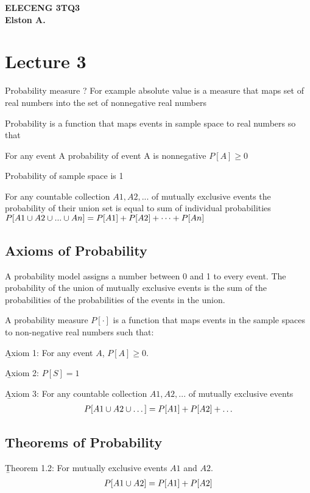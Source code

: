 \documentclass[12pt, titlepage, oneside]{article}
\begin{document}
	
	\textbf{ELECENG 3TQ3}\\
	\textbf{Elston A.}
	
	\section{Lecture 3}
	
	\items
 \item Probability measure ? For example absolute value is a measure that maps set of real numbers into the set of nonnegative real numbers
 \item Probability is a function that maps events in sample space to real numbers so that
 \item For any event A probability of event A is nonnegative $P[A] \geq 0$
 \item Probability of sample space is 1
\item For any countable collection $A1,A2,...$ of mutually exclusive events the probability of their union set is equal to sum of individual probabilities $P[A1 \cup A2 \cup ... \cup An] = P[A1] + P[A2] + \dots + P[An]$
\eitems


\subsection{Axioms of Probability}

A probability model assigns a number between 0 and 1 to every event. The probability of the union of mutually exclusive events is the sum of the probabilities of the probabilities of the events in the union.


A probability measure $P[\cdot]$ is a function that maps events in the sample spaces to non-negative real numbers such that:

\b{Axiom 1}: For any event $A$, $P[A] \geq 0$.

\b{Axiom 2}: $P[S] = 1$

\b{Axiom 3}: For any countable collection $A1,A2,...$ of mutually exclusive events
\begin{align}
P[A1 \cup A2 \cup \dots ] = P[A1] + P[A2] + \dots
\end{align}

\subsection{Theorems of Probability}


\b{Theorem 1.2}: For mutually exclusive events $A1$ and $A2$.
\begin{align}
P[A1 \cup A2] = P[A1] + P[A2]
\end{align}
\end{document}

